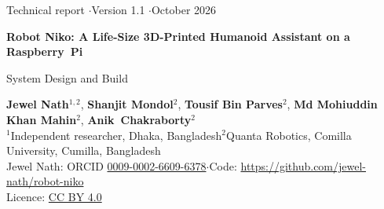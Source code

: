 \documentclass[11pt]{article}
\begin{document}
\thispagestyle{empty}
\begin{tcolorbox}[colback=accent, colframe=accent, arc=3pt, left=14pt, right=14pt, top=14pt, bottom=12pt]
  \color{white}\sffamily\raggedright
  {\small Technical report \quad$\cdot$\quad Version 1.1 \quad$\cdot$\quad October 2026}\par\vspace{8pt}
  {\LARGE\bfseries Robot Niko: A Life-Size 3D-Printed Humanoid Assistant on a Raspberry~Pi}\par\vspace{6pt}
  {\large System Design and Build}
\end{tcolorbox}

\vspace{4pt}
{\sffamily\raggedright
\textbf{Jewel Nath}$^{1,2}$, \textbf{Shanjit Mondol}$^{2}$, \textbf{Tousif Bin Parves}$^{2}$, \textbf{Md Mohiuddin Khan Mahin}$^{2}$, \mbox{\textbf{Anik Chakraborty}$^{2}$}\\[2pt]
{\small\color{muted}$^{1}$Independent researcher, Dhaka, Bangladesh\quad $^{2}$Quanta Robotics, Comilla University, Cumilla, Bangladesh}\\
{\small\color{muted}Jewel Nath: ORCID \href{https://orcid.org/0009-0002-6609-6378}{0009-0002-6609-6378}\quad$\cdot$\quad Code: \url{https://github.com/jewel-nath/robot-niko}}\\
{\small\color{muted}Licence: \href{https://creativecommons.org/licenses/by/4.0/}{CC BY 4.0}}\par}
\end{document}
